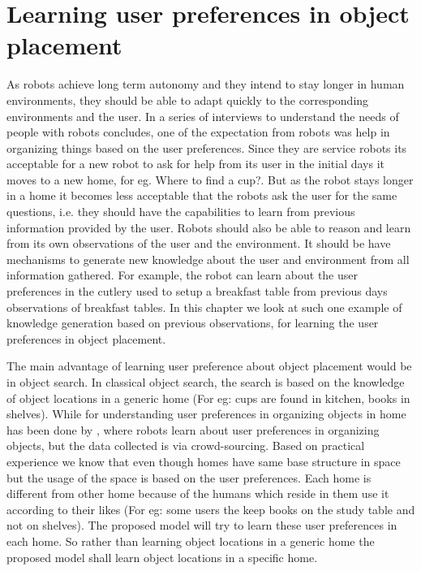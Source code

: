 \chapter{Learning user preferences in object placement}


As robots achieve long term autonomy and they intend to stay longer in human environments, they should be able to adapt quickly to the corresponding environments and the user.  In a series of interviews to understand the needs of people with robots \cite{pantofaru_exploring_2012} concludes, one of the
expectation from robots was help in organizing things based on the user preferences. Since they are service robots its acceptable for a new robot to ask for help from its user in the initial days it moves to a new home, for eg. Where to find a cup?. But as the robot stays longer in a home it becomes less acceptable that the robots ask the user for the same questions, i.e. they should have the capabilities to learn from previous information provided by the user. Robots should also be able to reason and learn from its own observations of the user and the environment. It should be have mechanisms to generate new knowledge about the user and environment from all information gathered. For example, the robot can learn about the user preferences in the cutlery used to setup a breakfast table from previous days observations of breakfast tables. In this chapter we look at such one example of knowledge generation based on previous observations, for learning the user preferences in object placement.

The main advantage of learning user preference about object placement would be in object search. In classical object search, the search is based on the knowledge of object locations in a generic home (For eg: cups are found in kitchen, books in shelves)\cite{samadi_using_2012, joho_learning_2011}. While for understanding user preferences in organizing objects in home has 
been done by  \cite{abdo_collaborative_2014}, where robots learn about user
preferences in organizing objects, but the data collected is via crowd-sourcing.  Based on practical experience we know that even though homes have same base structure in space but the usage of the space is based on the user preferences. Each home is different from other home because of the humans which reside in them use it according to their likes (For eg: some users the keep books on the study table and not on shelves). The proposed model will try to learn these user preferences in each home. So rather than learning object locations in a generic home the proposed model shall learn object locations in a specific home.


